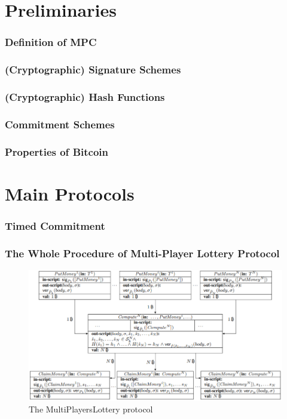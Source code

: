 \documentclass{beamer}
\begin{document}

\section{Preliminaries}

\begin{frame}\frametitle{Definition of MPC} 

\end{frame}

\begin{frame}\frametitle{(Cryptographic) Signature Schemes} 

\end{frame}

\begin{frame}\frametitle{(Cryptographic) Hash Functions} 

\end{frame}

\begin{frame}\frametitle{Commitment Schemes} 

\end{frame}

\begin{frame}\frametitle{Properties of Bitcoin} 

\end{frame}



\section{Main Protocols}

\begin{frame}\frametitle{Timed Commitment} 

\end{frame}

\begin{frame}\frametitle{The Whole Procedure of Multi-Player Lottery Protocol} 
\begin{figure}
	\includegraphics[width=4.6 in]{myfigs/lotteryprotocol1.jpg}
	\caption{The MultiPlayersLottery protocol}
\end{figure}

\end{frame}
\end{document}
